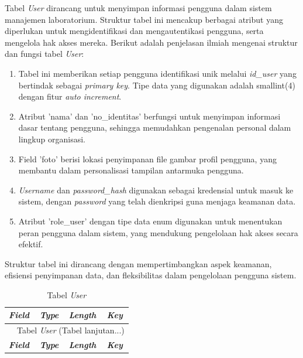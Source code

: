 \begin{enumerate}
	      Tabel \textit{User} dirancang untuk menyimpan informasi pengguna dalam sistem manajemen laboratorium. Struktur tabel ini mencakup berbagai atribut yang diperlukan untuk mengidentifikasi dan mengautentikasi pengguna, serta mengelola hak akses mereka. Berikut adalah penjelasan ilmiah mengenai struktur dan fungsi tabel \textit{User}:

	      \begin{enumerate}[label=\alph*.]
		      \item Tabel ini memberikan setiap pengguna identifikasi unik melalui \textit{id\_user} yang bertindak sebagai \textit{primary key}. Tipe data yang digunakan adalah smallint(4) dengan fitur \textit{auto increment}.
		      \item Atribut 'nama' dan 'no\_identitas' berfungsi untuk menyimpan informasi dasar tentang pengguna, sehingga memudahkan pengenalan personal dalam lingkup organisasi.
		      \item Field 'foto' berisi lokasi penyimpanan file gambar profil pengguna, yang membantu dalam personalisasi tampilan antarmuka pengguna.
		      \item \textit{Username} dan \textit{password\_hash} digunakan sebagai kredensial untuk masuk ke sistem, dengan \textit{password} yang telah dienkripsi guna menjaga keamanan data.
		      \item Atribut 'role\_user' dengan tipe data enum digunakan untuk menentukan peran pengguna dalam sistem, yang mendukung pengelolaan hak akses secara efektif.
	      \end{enumerate}

	      Struktur tabel ini dirancang dengan mempertimbangkan aspek keamanan, efisiensi penyimpanan data, dan fleksibilitas dalam pengelolaan pengguna sistem.

		      {
			      \fontsize{11}{13}\selectfont
			      \begin{longtable}{l l l l}
				      \caption{Tabel \textit{User}}
				      \label{admin}                                                                                       \\
				      \hline
				      \textbf{\textit{Field}} & \textbf{\textit{Type}} & \textbf{\textit{Length}} & \textbf{\textit{Key}} \\
				      \hline
				      \endfirsthead

				      \multicolumn{4}{c}{\tablename\ \thetable\ {Tabel \textit{User}} \space (Tabel lanjutan...)}         \\
				      \hline
				      \textbf{\textit{Field}} & \textbf{\textit{Type}} & \textbf{\textit{Length}} & \textbf{\textit{Key}} \\
				      \hline
				      \endhead


\end{longtable}}
\end{enumerate}
